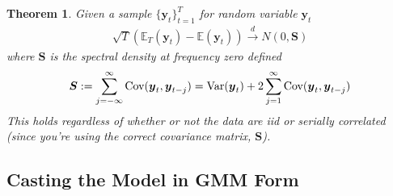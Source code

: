 \documentclass[12pt]{article}
\theoremstyle{plain}
\newtheorem{thm}{Theorem}[section]
\theoremstyle{definition}
\theoremstyle{remark}
\newcommand{\bsS}{\boldsymbol{S}}
\newcommand{\bsy}{\boldsymbol{y}}
\begin{document}
\begin{thm}
Given a sample $\{\bsy_t\}_{t=1}^T$ for random variable
$\bsy_t$
\begin{align*}
  \sqrt{T}\left(
    \mathbb{E}_T(\bsy_t) -\mathbb{E}(\bsy_t)
  \right)
  \xrightarrow{d} N(0,\bsS)
\end{align*}
where $\bsS$ is the spectral density at frequency zero defined
\begin{align*}
  \bsS :=
  \sum^\infty_{j=-\infty}
    \text{\normalfont Cov}(\bsy_t, \bsy_{t-j})
  =
  \text{\normalfont Var}(\bsy_t)
  + 2 \sum^\infty_{j=1}
  \text{\normalfont Cov}(\bsy_t,\bsy_{t-j})
\end{align*}
This holds regardless of whether or not the data are iid or serially
correlated (since you're using the correct covariance matrix,
$\bsS$).
\end{thm}

\clearpage
\subsection{Casting the Model in GMM Form}
\end{document}
